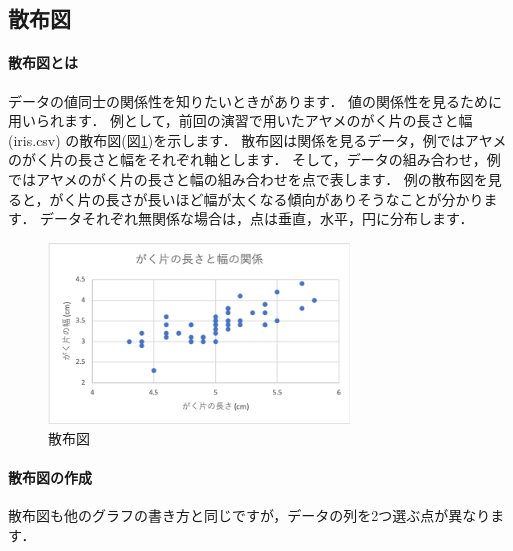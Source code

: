 \subsection{散布図}

\paragraph{散布図とは}

データの値同士の関係性を知りたいときがあります．
値の関係性を見るために用いられます．
例として，前回の演習で用いたアヤメのがく片の長さと幅 (iris.csv) の散布図(図\ref{fig:scatter})を示します．
散布図は関係を見るデータ，例ではアヤメのがく片の長さと幅をそれぞれ軸とします．
そして，データの組み合わせ，例ではアヤメのがく片の長さと幅の組み合わせを点で表します．
例の散布図を見ると，がく片の長さが長いほど幅が太くなる傾向がありそうなことが分かります．
データそれぞれ無関係な場合は，点は垂直，水平，円に分布します．

\begin{figure}[htbp]
    \centering
    \includegraphics[width=8cm]{chap2/scatter.png}
    \caption{散布図}
    \label{fig:scatter}
\end{figure}

\paragraph{散布図の作成}

散布図も他のグラフの書き方と同じですが，データの列を2つ選ぶ点が異なります．


